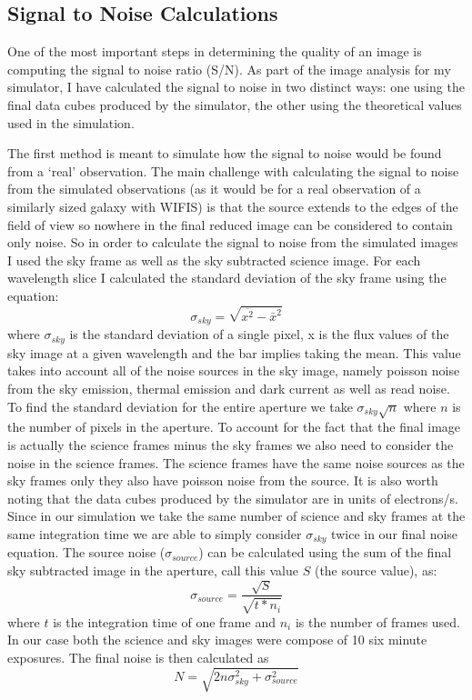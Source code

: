 \documentclass[11pt,twoside]{article}
\begin{document}
\subsection{Signal to Noise Calculations}
One of the most important steps in determining the quality of an image is computing the signal to noise ratio (S/N). As part of the image analysis for my simulator, I have calculated the signal to noise in two distinct ways: one using the final data cubes produced by the simulator, the other using the theoretical values used in the simulation. 

The first method is meant to simulate how the signal to noise would be found from a `real' observation. The main challenge with calculating the signal to noise from the simulated observations (as it would be for a real observation of a similarly sized galaxy with WIFIS) is that the source extends to the edges of the field of view so nowhere in the final reduced image can be considered to contain only noise. So in order to calculate the signal to noise from the simulated images I used the sky frame as well as the sky subtracted science image. For each wavelength slice I calculated the standard deviation of the sky frame using the equation: \begin{equation} \sigma_{sky}=\sqrt{\overline{x^2}-\bar{x}^2} \label{skyerr}\end{equation} where $\sigma_{sky}$ is the standard deviation of a single pixel, x is the flux values of the sky image at a given wavelength and the bar implies taking the mean. This value takes into account all of the noise sources in the sky image, namely poisson noise from the sky emission, thermal emission and dark current as well as read noise. To find the standard deviation for the entire aperture we take $\sigma_{sky}\sqrt{n}$ where $n$ is the number of pixels in the aperture. To account for the fact that the final image is actually the science frames minus the sky frames we also need to consider the noise in the science frames. The science frames have the same noise sources as the sky frames only they also have poisson noise from the source. It is also worth noting that the data cubes produced by the simulator are in units of electrons/s. Since in our simulation we take the same number of science and sky frames at the same integration time we are able to simply consider $\sigma_{sky}$ twice in our final noise equation. The source noise ($\sigma_{source}$) can be calculated using the sum of the final sky subtracted image in the aperture, call this value $S$ (the source value), as: \begin{equation} \sigma_{source}=\frac{\sqrt{S}}{\sqrt{t*n_i}} \end{equation} where $t$ is the integration time of one frame and $n_i$ is the number of frames used. In our case both the science and sky images were compose of 10 six minute exposures. The final noise is then calculated as \begin{equation}N=\sqrt{2n\sigma_{sky}^2+\sigma_{source}^2}\end{equation}
\end{document}
